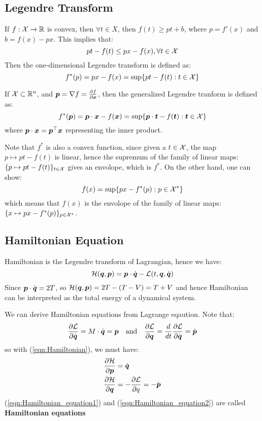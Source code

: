\documentclass[hidelinks]{article}[12pt]
\begin{document}
\subsection{Legendre Transform}
If $f: {\cal X} \to \mathbb R$ is convex, then $\forall t \in X$, then $f(t) \geq pt + b$, where $p = f'(x)$ and $b = f(x) - px$. This implies that:
\[pt - f(t) \leq px -f(x), \forall t \in {\cal X}\]
Then the one-dimensional Legendre transform is defined as: 
\[f^*(p) = px - f(x) = \sup\{pt - f(t) : t \in {\cal X}\}\]

If ${\cal X} \subset \mathbb R^n$, and $\boldsymbol{p} = \nabla f = \frac{\partial{f}}{\partial{\boldsymbol{x}}}$, then the generalized Legendre tranform is defined as:
\[f^*(\boldsymbol{p}) = \boldsymbol{p} \cdot \boldsymbol{x} - f(\boldsymbol{x}) = \sup\{\boldsymbol{p}\cdot \boldsymbol{t} - f(\boldsymbol{t}) : \boldsymbol{t} \in {\cal X}\}\]
where $\boldsymbol{p} \cdot \boldsymbol{x} = \boldsymbol{p}^{\top} \boldsymbol{x}$ representing the inner product. 

Note that $f^*$ is also a convex function, since given a $t \in {\cal X}$, the map $p \mapsto pt -f(t)$ is linear, hence the supremum of the family of linear maps: $\{p \mapsto pt-f(t)\}_{t \in {\cal X}}$ gives an envolope, which is $f^*$. On the other hand, one can show:
\[f(x) = \sup\{px - f^*(p) : p \in {\cal X}^*\}\]
which means that $f(x)$ is the envolope of the family of linear maps: $\{x \mapsto px - f^*(p)\}_{p \in {\cal X}^*}$. 



\subsection{Hamiltonian Equation}
Hamiltonian is the Legendre transform of Lagrangian, hence we have:
\begin{equation}
{\cal H}(\boldsymbol{q}, \boldsymbol{p}) = \boldsymbol{p} \cdot \dot{\boldsymbol{q}} - {\cal L}(t, \boldsymbol{q}, \dot{\boldsymbol{q}}) \label{eqn:Hamiltonian}
\end{equation}
Since $\boldsymbol{p}\cdot \dot{\boldsymbol{q}} = 2T$, so ${\cal H}(\boldsymbol{q}, \boldsymbol{p}) = 2T - (T - V) = T + V$ and hence Hamiltonian can be interpreted as the total energy of a dynamical system.


We can derive Hamiltonian equations from Lagrange eqaution. Note that:\[\frac{\partial{{\cal L}}}{\partial{\dot{\boldsymbol{q}}}} = M\cdot\dot{\boldsymbol{q}} = \boldsymbol{p} \quad \text{and} \quad \frac{\partial{{\cal L}}}{\partial{\boldsymbol{q}}} = \frac{d}{dt}\frac{\partial{{\cal L}}}{\partial{\dot{\boldsymbol{q}}}} = \dot{\boldsymbol{p}}\]
so with (\ref{eqn:Hamiltonian}), we must have:
\begin{align}
& \frac{\partial{{\cal H}}}{\partial{\boldsymbol{p}}} = \dot{\boldsymbol{q}} \label{eqn:Hamiltonian_equation1}\\
& \frac{\partial{{\cal H}}}{\partial{\boldsymbol{q}}} = -\frac{\partial{{\cal L}}}{\partial{q}} = - \dot{\boldsymbol{p}} \label{eqn:Hamiltonian_equation2}
\end{align}
(\ref{eqn:Hamiltonian_equation1}) and (\ref{eqn:Hamiltonian_equation2}) are called \textbf{Hamiltonian equations}
\end{document}
